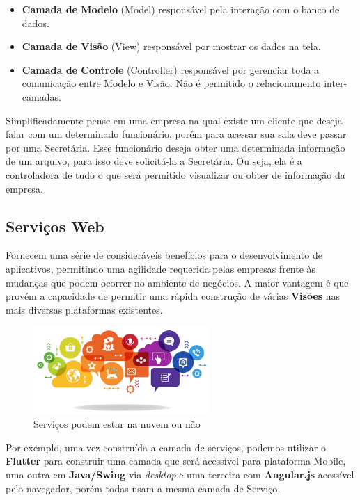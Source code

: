 \documentclass[a4paper,11pt]{article}
\begin{document}
\begin{itemize} \vspace{-1em}
  \item \textbf{Camada de Modelo} (Model) responsável pela interação com o banco de dados. 
  \item \textbf{Camada de Visão} (View) responsável por mostrar os dados na tela.
  \item \textbf{Camada de Controle} (Controller) responsável por gerenciar toda a comunicação entre Modelo e Visão. Não é permitido o relacionamento inter-camadas.
\end{itemize}

Simplificadamente pense em uma empresa na qual existe um cliente que deseja falar com um determinado funcionário, porém para acessar sua sala deve passar por uma Secretária. Esse funcionário deseja obter uma determinada informação de um arquivo, para isso deve solicitá-la a Secretária. Ou seja, ela é a controladora de tudo o que será permitido visualizar ou obter de informação da empresa.

\subsection{Serviços Web}
Fornecem uma série de consideráveis benefícios para o desenvolvimento de aplicativos, permitindo uma agilidade requerida pelas empresas frente às mudanças que podem ocorrer no ambiente de negócios. A maior vantagem é que provém a capacidade de permitir uma rápida construção de várias \textbf{Visões} nas mais diversas plataformas existentes. 
\begin{figure}[H]
	\centering
	\includegraphics[width=0.6\textwidth]{imagens/servicos.png}
	\caption{Serviços podem estar na nuvem ou não}
\end{figure}

Por exemplo, uma vez construída a camada de serviços, podemos utilizar o \textbf{Flutter} para construir uma camada que será acessível para plataforma Mobile, uma outra em \textbf{Java/Swing} via \textit{desktop} e uma terceira com \textbf{Angular.js} acessível pelo navegador, porém todas usam a mesma camada de Serviço.
\end{document}
